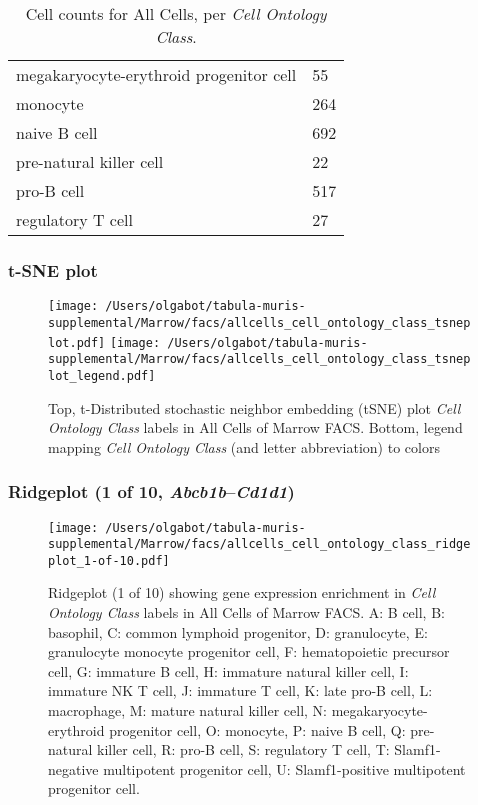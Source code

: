 \begin{table}[h]
\begin{tabular}{@{}ll@{}}
megakaryocyte-erythroid progenitor cell & 55 \\

monocyte & 264 \\

naive B cell & 692 \\

pre-natural killer cell & 22 \\

pro-B cell & 517 \\

regulatory T cell & 27 \\
\bottomrule
\end{tabular}
\caption{Cell counts for All Cells, per \emph{Cell Ontology Class}.}
\end{table}

\clearpage
\subsubsection{t-SNE plot}
\begin{figure}[h]
\centering
\texttt{[image: /Users/olgabot/tabula-muris-supplemental/Marrow/facs/allcells\_cell\_ontology\_class\_tsneplot.pdf]}
\texttt{[image: /Users/olgabot/tabula-muris-supplemental/Marrow/facs/allcells\_cell\_ontology\_class\_tsneplot\_legend.pdf]}
\caption{Top, t-Distributed stochastic neighbor embedding (tSNE) plot  \emph{Cell Ontology Class} labels in All Cells of Marrow FACS. Bottom, legend mapping \emph{Cell Ontology Class} (and letter abbreviation) to colors}
\end{figure}


\clearpage

\subsubsection{Ridgeplot (1 of 10, \emph{Abcb1b}--\emph{Cd1d1})}
\begin{figure}[h]
\centering
\texttt{[image: /Users/olgabot/tabula-muris-supplemental/Marrow/facs/allcells\_cell\_ontology\_class\_ridgeplot\_1-of-10.pdf]}

\caption{ Ridgeplot (1 of 10)  showing gene expression enrichment in \emph{Cell Ontology Class} labels in All Cells of Marrow FACS. A: B cell, B: basophil, C: common lymphoid progenitor, D: granulocyte, E: granulocyte monocyte progenitor cell, F: hematopoietic precursor cell, G: immature B cell, H: immature natural killer cell, I: immature NK T cell, J: immature T cell, K: late pro-B cell, L: macrophage, M: mature natural killer cell, N: megakaryocyte-erythroid progenitor cell, O: monocyte, P: naive B cell, Q: pre-natural killer cell, R: pro-B cell, S: regulatory T cell, T: Slamf1-negative multipotent progenitor cell, U: Slamf1-positive multipotent progenitor cell.}
\end{figure}


